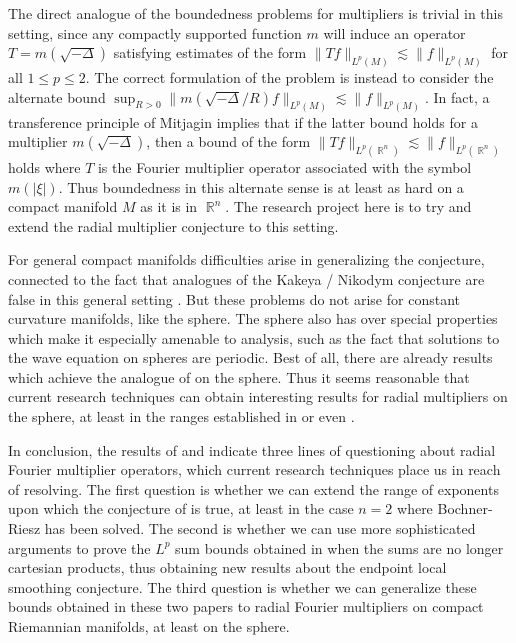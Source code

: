 \documentclass[12pt]{article}
\DeclareMathOperator{\RR}{\mathbb{R}}
\theoremstyle{plain}
\theoremstyle{remark}
\theoremstyle{definition}
\begin{document}
The direct analogue of the boundedness problems for multipliers is trivial in this setting, since any compactly supported function $m$ will induce an operator $T = m(\sqrt{-\Delta})$ satisfying estimates of the form $\| Tf \|_{L^p(M)} \lesssim \| f \|_{L^p(M)}$ for all $1 \leq p \leq 2$. The correct formulation of the problem is instead to consider the alternate bound $\sup_{R > 0} \| m(\sqrt{-\Delta}/R) f \|_{L^p(M)} \lesssim \| f \|_{L^p(M)}$. In fact, a transference principle of Mitjagin \cite{Mitjagin} implies that if the latter bound holds for a multiplier $m(\sqrt{-\Delta})$, then a bound of the form $\| Tf \|_{L^p(\RR^n)} \lesssim \| f \|_{L^p(\RR^n)}$ holds where $T$ is the Fourier multiplier operator associated with the symbol $m(|\xi|)$. Thus boundedness in this alternate sense is at least as hard on a compact manifold $M$ as it is in $\RR^n$. The research project here is to try and extend the radial multiplier conjecture to this setting.

For general compact manifolds difficulties arise in generalizing the conjecture, connected to the fact that analogues of the Kakeya / Nikodym conjecture are false in this general setting \cite{Minicozzi}. But these problems do not arise for constant curvature manifolds, like the sphere. The sphere also has over special properties which make it especially amenable to analysis, such as the fact that solutions to the wave equation on spheres are periodic. Best of all, there are already results which achieve the analogue of \cite{GarrigosandSeeger} on the sphere. Thus it seems reasonable that current research techniques can obtain interesting results for radial multipliers on the sphere, at least in the ranges established in \cite{HeoandNazarovandSeeger} or even \cite{Cladek}.

In conclusion, the results of \cite{HeoandNazarovandSeeger} and \cite{Cladek} indicate three lines of questioning about radial Fourier multiplier operators, which current research techniques place us in reach of resolving. The first question is whether we can extend the range of exponents upon which the conjecture of \cite{GarrigosandSeeger} is true, at least in the case $n = 2$ where Bochner-Riesz has been solved. The second is whether we can use more sophisticated arguments to prove the $L^p$ sum bounds obtained in \cite{Cladek} when the sums are no longer cartesian products, thus obtaining new results about the endpoint local smoothing conjecture. The third question is whether we can generalize these bounds obtained in these two papers to radial Fourier multipliers on compact Riemannian manifolds, at least on the sphere. 
\end{document}
